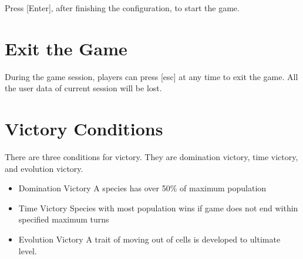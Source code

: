 \documentclass[12pt,a4paper]{scrartcl}
\begin{document}
Press [Enter], after finishing the configuration, to start the game.
\section{Exit the Game}
During the game session, players can press [esc] at any time to exit the game. All the user data of current session will be lost.

\section{Victory Conditions}
There are three conditions for victory. They are domination victory, time victory, and evolution victory.
\begin{itemize}
	\item Domination Victory
	\newline A species has over 50\% of maximum population
	\item Time Victory 
	\newline Species with most population wins if game does not end within specified maximum turns
	\item Evolution Victory
	\newline A trait of moving out of cells is developed to ultimate level.
\end{itemize}
\end{document}
